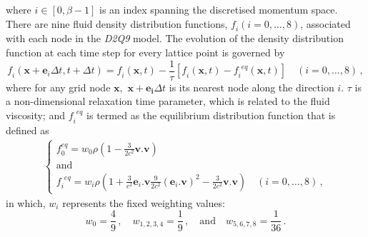 %
\noindent where $\mathit{i} \in [0, \beta -1]$ is an index spanning the 
discretised momentum space. There are nine fluid density distribution 
functions, $\mathit{f_i}(\mathit{i}=0,\dots,8)$, associated with each node 
in the \textit{D2Q9} model. The evolution of the density distribution function 
at each time step for every lattice point is governed by
%
\begin{equation} 
	\label{eq:stream}
	\mathit{f_i}(\mathbf{x}+\mathbf{e}_{\mathit{i}} \Delta t, t + \Delta t) = 
	\mathit{f_i}(\mathbf{x},t) - \frac{1}{\tau} [\mathit{f_i}(\mathbf{x},t) 
	-\mathit{f_i}^{\mathit{eq}}(\mathbf{x},t)] \quad (\mathit{i}=0,\dots,8) \,,
\end{equation}
%
\noindent where for any grid node $\mathbf{x},$ $\mathbf{x}+\mathbf{e_i} \Delta 
t$ is its nearest node along the direction $\mathit{i}$. $\tau$ is a 
non-dimensional relaxation time parameter, which is related to the fluid 
viscosity; and $\mathit{f_i}^{\mathit{eq}}$ is termed as the equilibrium 
distribution function that is defined as
%
\begin{align}
	\begin{cases}
	\mathit{f}_{\mathit{0}}^{\mathit{eq}} = \mathit{w}_{\mathit{0}} \rho (1 - 
	\frac{3}{2\mathit{c}^{\mathit{2}}}\mathbf{v}.\mathbf{v}) \\ 
	\mbox{and}\\
	\mathit{f_i}^{\mathit{eq}} = \mathit{w_i} \rho (1 + 
	\frac{3}{\mathit{c}^{\mathit{2}}}\mathbf{e}_{\mathit{i}}.\mathbf{v} 
	\frac{9}{2\mathit{c}^{\mathit{2}}} 
	(\mathbf{e}_{\mathit{i}}.\mathbf{v})^{\mathit{2}}-\frac{3}{2 
	\mathit{c}^{\mathit{2}}}\mathbf{v}.\mathbf{v}) \quad 
	(\mathit{i}=0,\dots,8)\,,
	\end{cases}
\end{align}
%
\noindent in which, $\mathit{w_i}$ represents the fixed weighting values:
%
\begin{equation}
	\mathit{w}_{\mathit{0}} = \frac{4}{9}\,, \quad 
	\mathit{w}_{\mathit{1,2,3,4}}= 
	\frac{1}{9}\,, \quad \mbox{and} \quad \mathit{w}_{\mathit{5,6,7,8}}= 
	\frac{1}{36}\,.
\end{equation}

